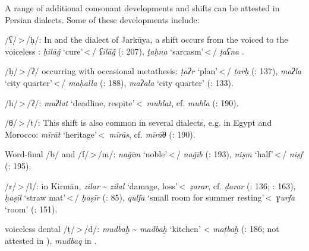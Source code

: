 \documentclass[output=paper]{langsci/langscibook}
\begin{document}
A range of additional consonant developments and shifts can be attested in Persian dialects. Some of these developments include:

\begin{altdescription}
\item[/ʕ/\,>\,/ḥ/:] In  and the dialect of Jarkūya, a shift occurs from the voiced to the voiceless : \textit{ḥilāǧ} ‘cure’\,<\,/ \textit{ʕilāǧ} (\citealt{Īzadpanāh2001}: 207), \textit{ṭaḥna} ‘sarcasm’\,<\,/ \textit{ṭaʕna} \citep{Borjian2008}.

\item[/ḥ/\,>\,/ʔ/ occurring with occasional metathesis:] \textit{ṭaʔr} ‘plan’\,<\,/ \textit{ṭarḥ} (\citealt{Ṣarrāfī1996}: 137), \textit{maʔla} ‘city quarter’\,<\,/ \textit{maḥalla} (\citealt{Ṣarrāfī1996}: 188), \textit{maʔala} ‘city quarter’ (\citealt{NaǧībiFīni2002}: 133).

\item[/h/\,>\,/ʔ/:] \textit{muʔlat} ‘deadline, respite’\,<\, \textit{muhlat}, cf.  \textit{muhla} (\citealt{Ṣarrāfī1996}: 190).

\item[/θ/\,>\,/t/:] This shift is also common in several  dialects, e.g. in Egypt and Morocco: \textit{mīrāt} ‘heritage’\,<\, \textit{mīrās}, cf.  \textit{mīrāθ} (\citealt{Īzadpanāh2001}: 190).

\item[Word-final /b/ and /f/\,>\,/m/:] \textit{naǧīm} ‘noble’\,<\,/ \textit{naǧīb} (\citealt{Īzadpanāh2001}: 193), \textit{niṣm} ‘half’\,<\,/ \textit{niṣf} (\citealt{Īzadpanāh2001}: 195).

\item[/r/\,>\,/l/:] in Kirmān, \textit{zilar} \~{} \textit{zilal} ‘damage, loss’\,<\, \textit{ẓarar}, cf.  \textit{ḍarar} (\citealt{Ṣarrāfī1996}: 136; \citealt{Dānišgar1995}: 163), \textit{ḥaṣīl} ‘straw mat’\,<\,/ \textit{ḥaṣīr} (\citealt{Ṣarrāfī1996}: 85), \textit{qulfa} ‘small room for summer resting’\,<\, \textit{ɣurfa} ‘room’ (\citealt{Fāẓilī2004}: 151).

\item[\ili{Arabic} voiceless dental \isi{emphatic} /ṭ/\,>\,/d/:] \textit{mudbaḫ} \~{} \textit{madbaḫ} ‘kitchen’ <  \textit{maṭbaḫ} (\citealt{Ṣarrāfī1996}: 186; not attested in ), \textit{mudbaq} in  \citep[251]{Sarlak2002}.


\end{altdescription}
\end{document}

